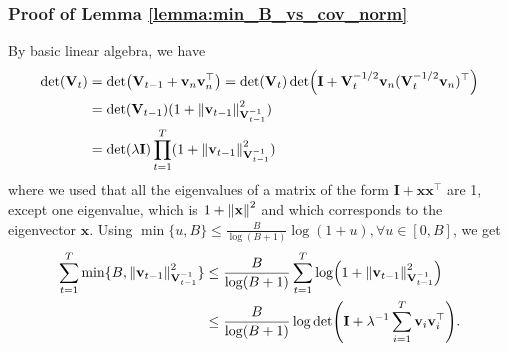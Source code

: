 \subsubsection{Proof of Lemma \ref{lemma:min_B_vs_cov_norm}}
\label{neural-bo_min_B_vs_cov_norm_proof}


By basic linear algebra, we have 
\begin{equation*}
\begin{split}
    \det (\mathbf{V}_t)  & = \det (\mathbf{V}_{t-1} + \mathbf{v}_n\mathbf{v}_n^\top) = \det(\mathbf{V}_t)\det(\mathbf{I}+\mathbf{V}_t^{-1/2}\mathbf{v}_n(\mathbf{V}_t^{-1/2}\mathbf{v}_n)^\top) \\
  & = \det(\mathbf{V}_{t-1})(1+\norm{\mathbf{v}_{t-1}}^2_{\mathbf{V}_{t-1}^{-1}}) \\
  & = \det (\lambda \mathbf{I}) \prod_{t=1}^T (1+\norm{\mathbf{v}_{t-1}}^2_{\mathbf{V}_{t-1}^{-1}}) \\
\end{split}
\end{equation*}
where we used that all the eigenvalues of a matrix of the form $\mathbf{I} + \mathbf{x}\mathbf{x}^\top$ are 1, except one eigenvalue, which is $1+\norm{\mathbf{x}}^2$ and which corresponds to the eigenvector $\mathbf{x}$. Using $\min\{u,B\} \leq \frac{B}{\log(B+1)}\log(1+u), \forall u \in [0,B]$, we get 
\begin{equation*}
    \begin{split}
        \sum_{t=1}^T \min \{B,\norm{\mathbf{v}_{t-1}}^2_{\mathbf{V}_{t-1}^{-1}}\} & \leq \frac{B}{\log(B+1)} \sum_{t=1}^T \log (1+\norm{\mathbf{v}_{t-1}}^2_{\mathbf{V}_{t-1}^{-1}}) \\
        & \leq \frac{B}{\log(B+1)} \log \det (\mathbf{I} + \lambda^{-1}\sum_{i=1}^T \mathbf{v}_i\mathbf{v}_i^\top ).
    \end{split}
\end{equation*}


